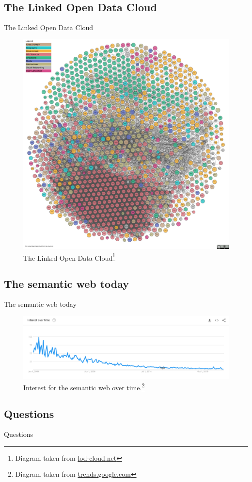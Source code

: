 \documentclass{beamer}
\begin{document}
	\subsection{The Linked Open Data Cloud}
	\begin{frame}{The Linked Open Data Cloud}
		\begin{figure}
			\includegraphics[scale=0.6]{resources/lod-cloud-sm.jpg}
			\caption{The Linked Open Data Cloud\footnote[frame]{%
				Diagram taken from \url{lod-cloud.net} }}
		\end{figure}
	\end{frame}

	\subsection{The semantic web today}
	\begin{frame}{The semantic web today}
		\begin{figure}
			\includegraphics[scale=0.25]{resources/semantic-web-is-dead.png}
			\caption{Interest for the semantic web over time.\footnote[frame]{%
				Diagram taken from \url{trends.google.com} }}
		\end{figure}
	\end{frame}

	\subsection{Questions}
	\begin{frame}[label=questions]{Questions}
	\end{frame}
\end{document}
